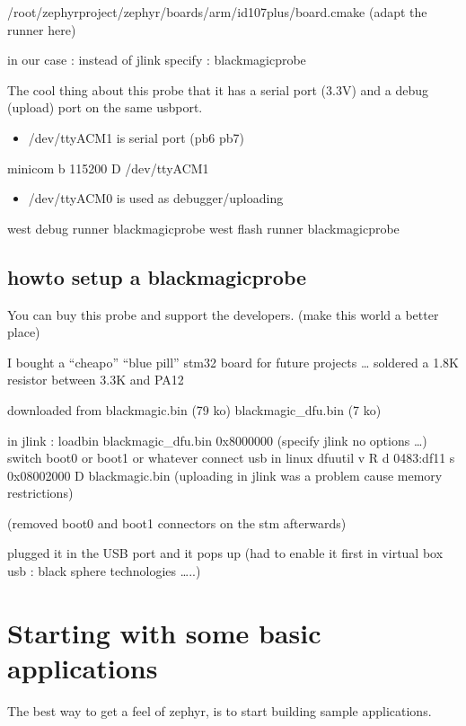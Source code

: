 \documentclass[letterpaper,10pt,english]{sphinxmanual}
\begin{document}
/root/zephyrproject/zephyr/boards/arm/id107plus/board.cmake (adapt the runner here)

in our case : instead of jlink specify : blackmagicprobe

The cool thing about this probe that it has a serial port (3.3V) and a debug (upload) port on the same usb\sphinxhyphen{}port.
\begin{itemize}
\item {} 
/dev/ttyACM1 is serial port (pb6 pb7)

\end{itemize}

minicom \sphinxhyphen{}b 115200 \sphinxhyphen{}D /dev/ttyACM1
\begin{itemize}
\item {} 
/dev/ttyACM0 is used as debugger/uploading

\end{itemize}

west debug \textendash{}runner blackmagicprobe
west flash \textendash{}runner blackmagicprobe


\section{howto setup a blackmagicprobe}
\label{\detokenize{blackmagicprobe:howto-setup-a-blackmagicprobe}}
You can buy this probe and support the developers. (make this world a better place)

I bought a “cheapo” “blue pill” stm32 board for future projects …
soldered a 1.8K resistor between 3.3K and PA12

downloaded from 
\sphinxhyphen{} blackmagic.bin (79 ko)
\sphinxhyphen{} blackmagic\_dfu.bin (7 ko)

in jlink : loadbin blackmagic\_dfu.bin 0x8000000 (specify jlink no options …)
switch boot0 or boot1 or whatever
connect usb
in linux
dfu\sphinxhyphen{}util \sphinxhyphen{}v \sphinxhyphen{}R \sphinxhyphen{}d 0483:df11 \sphinxhyphen{}s 0x08002000 \sphinxhyphen{}D blackmagic.bin
(uploading in jlink was a problem cause memory restrictions)

\noindent{}

(removed boot0 and boot1 connectors on the stm afterwards)

plugged it in the USB port and it pops up (had to enable it first in virtual box usb : black sphere technologies …..)


\chapter{Starting with some basic applications}
\label{\detokenize{basicapplications:starting-with-some-basic-applications}}\label{\detokenize{basicapplications::doc}}
The best way to get a feel of zephyr, is to start building sample applications.
\end{document}
